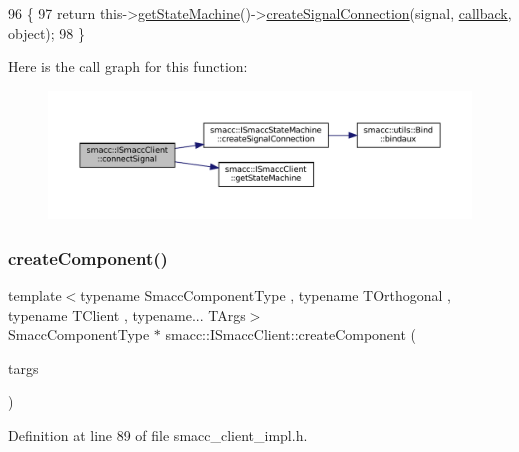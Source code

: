 \begin{DoxyCode}
96 \{
97     \textcolor{keywordflow}{return} this->\hyperlink{classsmacc_1_1ISmaccClient_aec51d4712404cb9882b86e4c854bb93a}{getStateMachine}()->\hyperlink{classsmacc_1_1ISmaccStateMachine_adf0f42ade0c65cc471960fe2a7c42da2}{createSignalConnection}(signal, 
      \hyperlink{servers_2opencv__perception__node_2opencv__perception__node_8cpp_a050e697bd654facce10ea3f6549669b3}{callback}, \textcolor{keywordtype}{object});
98 \}
\end{DoxyCode}
Here is the call graph for this function\+:
\nopagebreak
\begin{figure}[H]
\begin{center}
\leavevmode
\includegraphics[width=350pt]{classsmacc_1_1ISmaccClient_addce4ebcdebc5a7a3f80c0980862575d_cgraph}
\end{center}
\end{figure}
\mbox{\label{classsmacc_1_1ISmaccClient_a5c1c8eb5e91a3b399662a52cb0ca86aa}} 
\subsubsection{\texorpdfstring{create\+Component()}{createComponent()}}
{\footnotesize\ttfamily template$<$typename Smacc\+Component\+Type , typename T\+Orthogonal , typename T\+Client , typename... T\+Args$>$ \\
Smacc\+Component\+Type $\ast$ smacc\+::\+I\+Smacc\+Client\+::create\+Component (\begin{DoxyParamCaption}\item[{T\+Args...}]{targs }\end{DoxyParamCaption})\hspace{0.3cm}{\ttfamily [protected]}}



Definition at line 89 of file smacc\+\_\+client\+\_\+impl.\+h.



